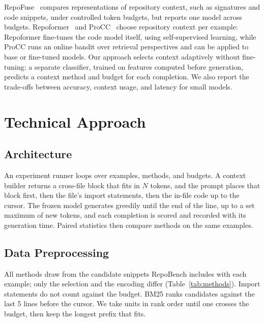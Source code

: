 \documentclass[10pt,twocolumn,letterpaper]{article}
\begin{document}
RepoFuse~\cite{liang2024repofuse} compares representations of repository context, such as
signatures and code snippets, under controlled token budgets, but reports one model across
budgets. Repoformer~\cite{wu2024repoformer} and ProCC~\cite{tan2024procc} choose repository
context per example: Repoformer fine-tunes the code model itself, using self-supervised
learning, while ProCC runs an online bandit over retrieval perspectives and can be applied to
base or fine-tuned models. Our approach selects context adaptively without fine-tuning: a
separate classifier, trained on features computed before generation, predicts a context method
and budget for each completion. We also report the trade-offs between accuracy, context usage,
and latency for small models.

\section{Technical Approach}

\subsection{Architecture}

An experiment runner loops over examples, methods, and budgets. A context builder returns a
cross-file block that fits in $N$ tokens, and the prompt places that block first, then the
file's import statements, then the in-file code up to the cursor. The frozen model generates
greedily until the end of the line, up to a set maximum of new tokens, and each completion is
scored and recorded with its generation time. Paired statistics then compare methods on the
same examples.

\subsection{Data Preprocessing}

All methods draw from the candidate snippets RepoBench includes with each example; only the
selection and the encoding differ (Table~\ref{tab:methods}). Import statements do not count
against the budget. BM25 ranks candidates against the last 5 lines before the cursor. We take
units in rank order until one crosses the budget, then keep the longest prefix that fits.
\end{document}
